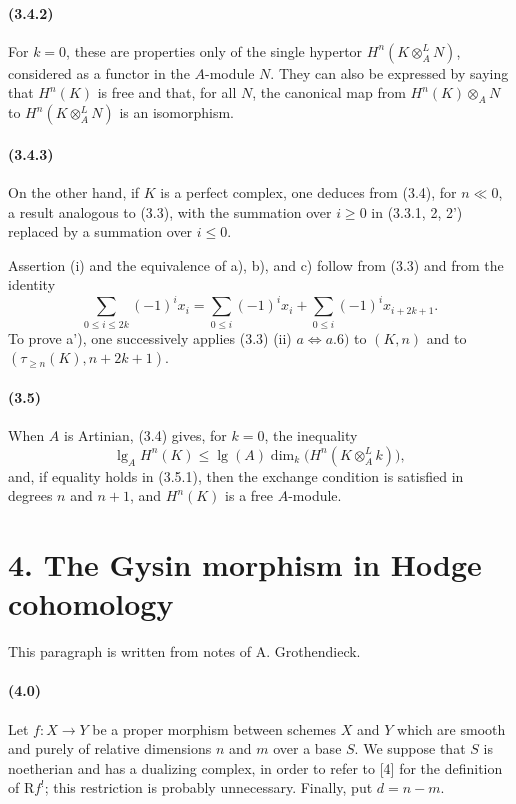 \documentclass[10pt]{article}
\newcommand{\R}{\mathrm R}
\providecommand{\lgop}{\operatorname{lg}}
\begin{document}
\paragraph{(3.4.2)} For $k=0$, these are properties only of the single hypertor $H^n(K\otimes_A^L N)$, considered as a functor in the $A$-module $N$. They can also be expressed by saying that $H^n(K)$ is free and that, for all $N$, the canonical map from $H^n(K)\otimes_A N$ to $H^n(K\otimes_A^L N)$ is an isomorphism.

\paragraph{(3.4.3)} On the other hand, if $K$ is a perfect complex, one deduces from (3.4), for $n\ll0$, a result analogous to (3.3), with the summation over $i\ge0$ in (3.3.1, 2, 2') replaced by a summation over $i\le0$.

Assertion (i) and the equivalence of a), b), and c) follow from (3.3) and from the identity
\[
\sum_{0\le i\le 2k}(-1)^i x_i=
\sum_{0\le i}(-1)^i x_i+
\sum_{0\le i}(-1)^i x_{i+2k+1}.
\]
To prove a'), one successively applies (3.3) (ii) $a\Leftrightarrow a.6)$ to $(K,n)$ and to $(\tau_{\ge n}(K),n+2k+1)$.

\paragraph{(3.5)} When $A$ is Artinian, (3.4) gives, for $k=0$, the inequality
\[
\tag{3.5.1}
\lgop_AH^n(K)\le\lgop(A)\dim_k\bigl(H^n(K\otimes_A^L k)\bigr),
\]
and, if equality holds in (3.5.1), then the exchange condition is satisfied in degrees $n$ and $n+1$, and $H^n(K)$ is a free $A$-module.

\section*{4. The Gysin morphism in Hodge cohomology}

This paragraph is written from notes of A. Grothendieck.

\paragraph{(4.0)} Let $f:X\to Y$ be a proper morphism between schemes $X$ and $Y$ which are smooth and purely of relative dimensions $n$ and $m$ over a base $S$. We suppose that $S$ is noetherian and has a dualizing complex, in order to refer to [4] for the definition of $\R f^!$; this restriction is probably unnecessary. Finally, put $d=n-m$.
\end{document}
